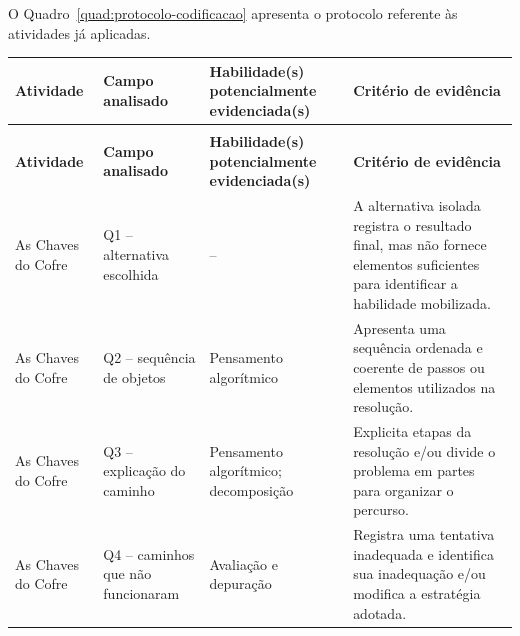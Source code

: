 O Quadro~\ref{quad:protocolo-codificacao} apresenta o protocolo referente às atividades já aplicadas.

{
\captionsetup{
    type=quadro,
    font=footnotesize,
    justification=raggedright,
    singlelinecheck=false
}

\label{quad:protocolo-codificacao}

\footnotesize
\renewcommand{\arraystretch}{1.15}

\begin{xltabular}{\textwidth}{
    |>{\raggedright\arraybackslash}p{2.6cm}
    |>{\raggedright\arraybackslash}p{3.2cm}
    |>{\raggedright\arraybackslash}p{3.5cm}
    |>{\raggedright\arraybackslash}X|}
    \hline

    \textbf{Atividade} &
    \textbf{Campo analisado} &
    \textbf{Habilidade(s) potencialmente evidenciada(s)} &
    \textbf{Critério de evidência} \\
    \hline
    \endfirsthead

     \\[2mm]

    \hline
    \textbf{Atividade} &
    \textbf{Campo analisado} &
    \textbf{Habilidade(s) potencialmente evidenciada(s)} &
    \textbf{Critério de evidência} \\
    \hline
    \endhead

    As Chaves do Cofre &
    Q1 -- alternativa escolhida &
    -- &
    A alternativa isolada registra o resultado final, mas não fornece elementos suficientes para identificar a habilidade mobilizada. \\
    \hline

    As Chaves do Cofre &
    Q2 -- sequência de objetos &
    Pensamento algorítmico &
    Apresenta uma sequência ordenada e coerente de passos ou elementos utilizados na resolução. \\
    \hline

    As Chaves do Cofre &
    Q3 -- explicação do caminho &
    Pensamento algorítmico; decomposição &
    Explicita etapas da resolução e/ou divide o problema em partes para organizar o percurso. \\
    \hline

    As Chaves do Cofre &
    Q4 -- caminhos que não funcionaram &
    Avaliação e depuração &
    Registra uma tentativa inadequada e identifica sua inadequação e/ou modifica a estratégia adotada. \\
    \hline


\end{xltabular}}
